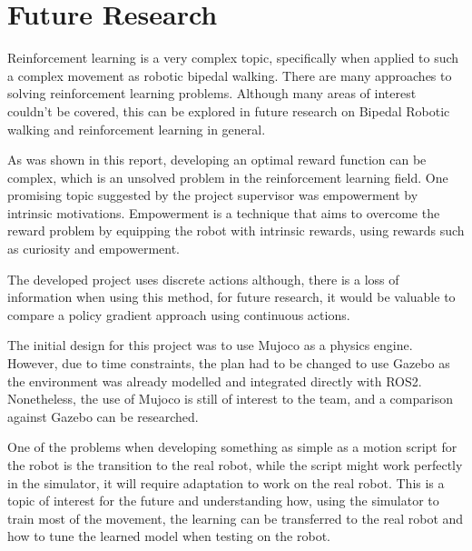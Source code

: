 \chapter{Future Research}
Reinforcement learning is a very complex topic, specifically when applied to such a complex movement as robotic bipedal walking. There are many approaches to solving reinforcement learning problems. Although many areas of interest couldn't be covered, this can be explored in future research on Bipedal Robotic walking and reinforcement learning in general.

As was shown in this report, developing an optimal reward function can be complex, which is an unsolved problem in the reinforcement learning field. One promising topic suggested by the project supervisor was empowerment\cite{empowerment} by intrinsic motivations. Empowerment is a technique that aims to overcome the reward problem by equipping the robot with intrinsic rewards, using rewards such as curiosity and empowerment.

The developed project uses discrete actions although, there is a loss of information when using this method, for future research, it would be valuable to compare a policy gradient approach using continuous actions.

The initial design for this project was to use Mujoco as a physics engine. However, due to time constraints, the plan had to be changed to use Gazebo as the environment was already modelled and integrated directly with ROS2. Nonetheless, the use of Mujoco is still of interest to the team, and a comparison against Gazebo can be researched.

One of the problems when developing something as simple as a motion script for the robot is the transition to the real robot, while the script might work perfectly in the simulator, it will require adaptation to work on the real robot. This is a topic of interest for the future and understanding how, using the simulator to train most of the movement, the learning can be transferred to the real robot and how to tune the learned model when testing on the robot.

